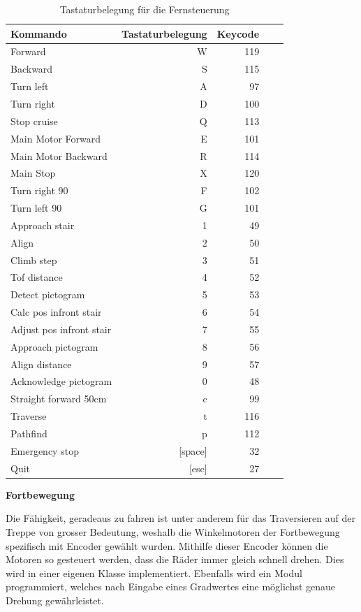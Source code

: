 \begin{table}[H]
\centering
\begin{tabular}{|l|r|r|r|r|}
\hline
\textbf{Kommando} & \textbf{Tastaturbelegung} &
\textbf{Keycode}\\
\hline
Forward & W & 119\\
\hline
Backward & S & 115\\
\hline
Turn left & A & 97\\
\hline
Turn right & D & 100\\
\hline
Stop cruise & Q & 113\\
\hline
Main Motor Forward & E & 101\\ 
\hline
Main Motor Backward & R & 114\\ 
\hline
Main Stop & X & 120\\ 
\hline
Turn right 90 & F & 102\\ 
\hline
Turn left 90 & G & 101\\ 
\hline
Approach stair & 1 & 49\\ 
\hline
Align & 2 & 50\\ 
\hline
Climb step & 3 & 51\\ 
\hline
Tof distance & 4 & 52\\ 
\hline
Detect pictogram & 5 & 53\\ 
\hline
Calc pos infront stair & 6 & 54\\ 
\hline
Adjust pos infront stair & 7 & 55\\ 
\hline
Approach pictogram & 8 & 56\\ 
\hline
Align distance & 9 & 57\\ 
\hline
Acknowledge pictogram & 0 & 48\\ 
\hline
Straight forward 50cm & c & 99\\ 
\hline
Traverse & t & 116\\ 
\hline
Pathfind & p & 112\\ 
\hline
Emergency stop & [space] & 32\\ 
\hline
Quit & [esc] & 27\\ 
\hline
\end{tabular}
\caption[Tastaturbelegung für die Fernsteuerung]{Tastaturbelegung für die Fernsteuerung}
\label{tab:tastaturbelegung-fernbedienung}
\end{table}


\newpage

\textbf{Fortbewegung}

Die Fähigkeit, geradeaus zu fahren ist unter anderem für das Traversieren auf der Treppe von grosser Bedeutung, weshalb die Winkelmotoren der Fortbewegung spezifisch mit Encoder gewählt wurden. Mithilfe dieser Encoder können die Motoren so gesteuert werden, dass die Räder immer gleich schnell drehen. Dies wird in einer eigenen Klasse implementiert. Ebenfalls wird ein Modul programmiert, welches nach Eingabe eines Gradwertes eine möglichst genaue Drehung gewährleistet.

